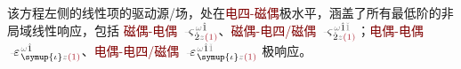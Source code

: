 该方程左侧的线性项的驱动源/场，处在\textcolor{Maroon}{电四-磁偶}极水平，涵盖了所有最低阶的非局域线性响应，包括 \textcolor{Maroon}{磁偶-电偶} $\Xint{\begin{smallmatrix} ~ \\ {}^{}_{\mathcolor{gray}{-}} \\ ~ \end{smallmatrix}}{13}{\varsigma}^{\;\! \mathcolor{gray}{\omega} \hat{1}}_{\;\! \dot{2} \mathcolor{gray}{z} \textcolor{Maroon}{(1)}}$、\textcolor{Maroon}{磁偶-电四/磁偶} $\Xint{\begin{smallmatrix} ~ \\ {}^{}_{\mathcolor{gray}{-}} \\ ~ \end{smallmatrix}}{13}{\varsigma}^{\;\! \mathcolor{gray}{\omega} \hat{1} \mathcolor{gray}{\check{1}}}_{\;\! \dot{2} \mathcolor{gray}{z} \textcolor{Maroon}{(1)}}$；\textcolor{Maroon}{电偶-电偶} $\Xint{\begin{smallmatrix} ~ \\ {}^{}_{\mathcolor{gray}{-}} \\ ~ \end{smallmatrix}}{16}{\varepsilon}^{\;\! \mathcolor{gray}{\omega} \hat{1}}_{\;\! \symup{\iota} \mathcolor{gray}{z} \textcolor{Maroon}{(1)}}$、\textcolor{Maroon}{电偶-电四/磁偶} $\Xint{\begin{smallmatrix} ~ \\ {}^{}_{\mathcolor{gray}{-}} \\ ~ \end{smallmatrix}}{16}{\varepsilon}^{\;\! \mathcolor{gray}{\omega} \hat{1} \mathcolor{gray}{\check{1}}}_{\;\! \symup{\iota} \mathcolor{gray}{z} \textcolor{Maroon}{(1)}}$ 极响应。

